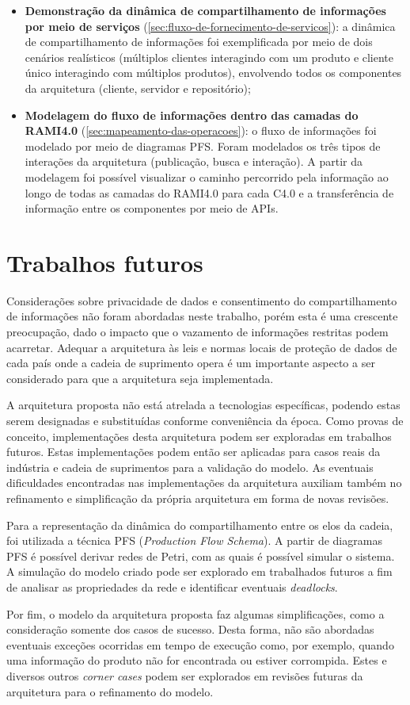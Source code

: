 \begin{itemize}
  \item \textbf{Demonstração da dinâmica de compartilhamento de informações por meio de serviços} (\autoref{sec:fluxo-de-fornecimento-de-servicos}): a dinâmica de compartilhamento de informações foi exemplificada por meio de dois cenários realísticos (múltiplos clientes interagindo com um produto e cliente único interagindo com múltiplos produtos), envolvendo todos os componentes da arquitetura (cliente, servidor e repositório);
  \item \textbf{Modelagem do fluxo de informações dentro das camadas do RAMI4.0} (\autoref{sec:mapeamento-das-operacoes}): o fluxo de informações foi modelado por meio de diagramas PFS. Foram modelados os três tipos de interações da arquitetura (publicação, busca e interação). A partir da modelagem foi possível visualizar o caminho percorrido pela informação ao longo de todas as camadas do RAMI4.0 para cada C4.0 e a transferência de informação entre os componentes por meio de APIs.
\end{itemize}

\section{Trabalhos futuros}

Considerações sobre privacidade de dados e consentimento do compartilhamento de informações não foram abordadas neste trabalho, porém esta é uma crescente preocupação, dado o impacto que o vazamento de informações restritas podem acarretar. Adequar a arquitetura às leis e normas locais de proteção de dados de cada país onde a cadeia de suprimento opera é um importante aspecto a ser considerado para que a arquitetura seja implementada.

A arquitetura proposta não está atrelada a tecnologias específicas, podendo estas serem designadas e substituídas conforme conveniência da época. Como provas de conceito, implementações desta arquitetura podem ser exploradas em trabalhos futuros. Estas implementações podem então ser aplicadas para casos reais da indústria e cadeia de suprimentos para a validação do modelo. As eventuais dificuldades encontradas nas implementações da arquitetura auxiliam também no refinamento e simplificação da própria arquitetura em forma de novas revisões.

Para a representação da dinâmica do compartilhamento entre os elos da cadeia, foi utilizada a técnica PFS (\textit{Production Flow Schema}). A partir de diagramas PFS é possível derivar redes de Petri, com as quais é possível simular o sistema. A simulação do modelo criado pode ser explorado em trabalhados futuros a fim de analisar as propriedades da rede e identificar eventuais \textit{deadlocks}.

Por fim, o modelo da arquitetura proposta faz algumas simplificações, como a consideração somente dos casos de sucesso. Desta forma, não são abordadas eventuais exceções ocorridas em tempo de execução como, por exemplo, quando uma informação do produto não for encontrada ou estiver corrompida. Estes e diversos outros \textit{corner cases} podem ser explorados em revisões futuras da arquitetura para o refinamento do modelo.
